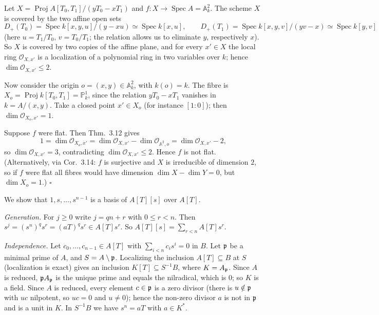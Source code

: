 \documentclass[11pt]{article}
\begin{document}
\pf
Let $X=\operatorname{Proj}A[T_0,T_1]/(yT_0-xT_1)$ and $f:X\to\operatorname{Spec}A=\mathbb A^2_k$. The scheme $X$ is covered by the two affine open sets
\[ D_+(T_0)=\operatorname{Spec}k[x,y,u]/(y-xu)\simeq\operatorname{Spec}k[x,u],\qquad D_+(T_1)=\operatorname{Spec}k[x,y,v]/(yv-x)\simeq\operatorname{Spec}k[y,v] \]
(here $u=T_1/T_0$, $v=T_0/T_1$; the relation allows us to eliminate $y$, respectively $x$). So $X$ is covered by two copies of the affine plane, and for every $x'\in X$ the local ring $\mathcal O_{X,x'}$ is a localization of a polynomial ring in two variables over $k$; hence $\dim\mathcal O_{X,x'}\le2$.

Now consider the origin $o=(x,y)\in\mathbb A^2_k$, with $k(o)=k$. The fibre is $X_o=\operatorname{Proj}k[T_0,T_1]=\mathbb P^1_k$, since the relation $yT_0-xT_1$ vanishes in $k=A/(x,y)$. Take a closed point $x'\in X_o$ (for instance $[1:0]$); then $\dim\mathcal O_{X_o,x'}=1$.

Suppose $f$ were flat. Then Thm.~3.12 gives
\[ 1=\dim\mathcal O_{X_o,x'}=\dim\mathcal O_{X,x'}-\dim\mathcal O_{\mathbb A^2,o}=\dim\mathcal O_{X,x'}-2, \]
so $\dim\mathcal O_{X,x'}=3$, contradicting $\dim\mathcal O_{X,x'}\le2$. Hence $f$ is not flat. (Alternatively, via Cor.~3.14: $f$ is surjective and $X$ is irreducible of dimension $2$, so if $f$ were flat all fibres would have dimension $\dim X-\dim Y=0$, but $\dim X_o=1$.) \hfill$\square$

\pf
We show that $1,s,\dots,s^{n-1}$ is a basis of $A[T][s]$ over $A[T]$.

\emph{Generation.} For $j\ge0$ write $j=qn+r$ with $0\le r<n$. Then $s^j=(s^n)^qs^r=(aT)^qs^r\in A[T]s^r$. So $A[T][s]=\sum_{r<n}A[T]s^r$.

\emph{Independence.} Let $c_0,\dots,c_{n-1}\in A[T]$ with $\sum_{i<n}c_is^i=0$ in $B$. Let $\mathfrak p$ be a minimal prime of $A$, and $S=A\setminus\mathfrak p$. Localizing the inclusion $A[T]\subseteq B$ at $S$ (localization is exact) gives an inclusion $K[T]\subseteq S^{-1}B$, where $K=A_{\mathfrak p}$. Since $A$ is reduced, $\mathfrak p A_{\mathfrak p}$ is the unique prime and equals the nilradical, which is $0$; so $K$ is a field. Since $A$ is reduced, every element $c\in\mathfrak p$ is a zero divisor (there is $u\notin\mathfrak p$ with $uc$ nilpotent, so $uc=0$ and $u\neq0$); hence the non-zero divisor $a$ is not in $\mathfrak p$ and is a unit in $K$. In $S^{-1}B$ we have $s^n=aT$ with $a\in K^*$.
\end{document}
